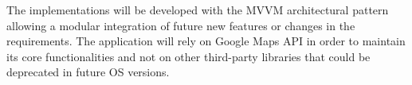 The implementations will be developed with the MVVM architectural pattern allowing a modular integration of future new features or changes in the requirements. 
The application will rely on Google Maps API in order to maintain its core functionalities and not on other third-party libraries that could be deprecated in future OS versions.
